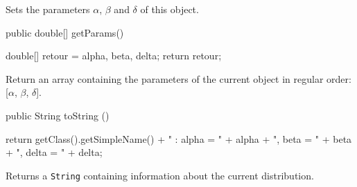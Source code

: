  \begin{tabb}
   Sets the parameters  $\alpha$, $\beta$  and $\delta$ of this object.
 \end{tabb}
\begin{code}

   public double[] getParams()\begin{hide} {
      double[] retour = {alpha, beta, delta};
      return retour;
   }\end{hide}
\end{code}
\begin{tabb}
   Return an array containing the parameters of the current object
    in regular order: [$\alpha$, $\beta$, $\delta$].
\end{tabb}
\begin{hide}\begin{code}

   public String toString ()\begin{hide} {
      return getClass().getSimpleName() + " : alpha = " + alpha + ", beta = " + beta + ", delta = " + delta;
   }\end{hide}
\end{code}
\begin{tabb}
   Returns a \texttt{String} containing information about the current distribution.
\end{tabb}\end{hide}
\begin{code}\begin{hide}
}\end{hide}
\end{code}
